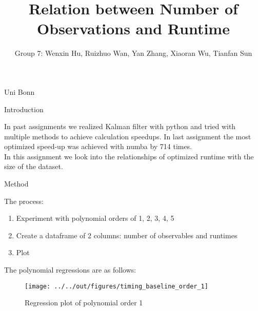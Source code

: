 \documentclass[11pt]{beamer}
\begin{document}
\title{Relation between Number of Observations and Runtime}

\author{Group 7: Wenxin Hu, Ruizhuo Wan, Yan Zhang, Xiaoran Wu, Tianfan Sun}
{
{\small Uni Bonn}\\[1ex]
}


\begin{frame}
    \titlepage
    \note{~}
\end{frame}


\begin{frame}
        Introduction
\end{frame}


\begin{frame}
        In past assignments we realized Kalman filter with python and tried with multiple
        methods to achieve calculation speedups. In last assignment the most optimized speed-up was achieved with numba by 714 times. \\

        In this assignment we look into the relationships of optimized runtime with the size of the dataset.
\end{frame}


\begin{frame}
        Method
\end{frame}


\begin{frame}
        The process:
        \begin{enumerate}
                \item Experiment with polynomial orders of 1, 2, 3, 4, 5
                \item Create a dataframe of 2 columns: number of observables and runtimes
                \item Plot
        \end{enumerate}
\end{frame}


\begin{frame}
        The polynomial regressions are as follows:\\
        
\end{frame}


\begin{frame}
        \begin{figure}
    \caption{Regression plot of polynomial order 1}
    \texttt{[image: ../../out/figures/timing\_baseline\_order\_1]}
        \end{figure}
\end{frame}
\end{document}

